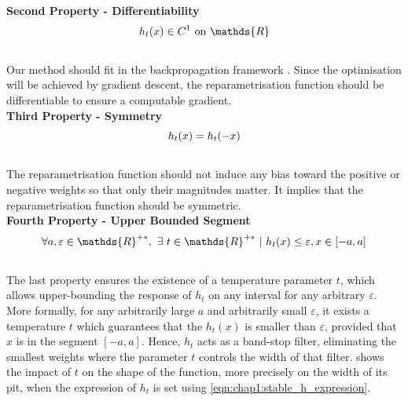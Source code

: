\noindent\textbf{Second Property - Differentiability} \\
\begin{equation}
  \centering
  h_t(x) \in C^1 \text{ on } \mathds{R}
  \label{eqn:chap1:reparam_prop2}
\end{equation}
\\
Our method should fit in the backpropagation framework \cite{rumelhart1986learning}. Since the optimisation will
be achieved by gradient descent, the reparametrisation function should be
differentiable to ensure a computable gradient.\\

\noindent\textbf{Third Property - Symmetry} \\

\begin{equation}
  \centering
  h_t(x) = h_t(-x)
  \label{eqn:chap1:reparam_prop3}
\end{equation}
\\
The reparametrisation function should not induce any bias toward the positive or
negative weights so that only their magnitudes matter. It implies that the
reparametrisation function should be symmetric.\\


\noindent\textbf{Fourth Property - Upper Bounded Segment} \\

\begin{equation}
  \centering
  \forall a,\varepsilon \in\mathds{R}^{+\ast},~ \exists ~t
  \in\mathds{R}^{+\ast} ~ | ~ h_t(x) \leq \varepsilon, x \in [-a,a]
  \label{eqn:chap1:reparam_prop4}
\end{equation}
\\
The last property ensures the existence of a temperature parameter $t$, which
allows upper-bounding the response of $h_t$ on any interval for any arbitrary
$\varepsilon$. More formally, for any arbitrarily large $a$ and arbitrarily
small $\varepsilon$, it exists a temperature $t$ which guarantees that the
$h_t(x)$ is smaller than $\varepsilon$, provided that $x$ is in the segment
$[-a, a]$. Hence, $h_t$ acts as a band-stop filter, eliminating the smallest
weights where the parameter $t$ controls the width of that filter.
 shows the impact of $t$ on the shape of
the function, more precisely on the width of its pit, when the expression of
$h_t$ is set using \cref{eqn:chap1:stable_h_expression}.\\

